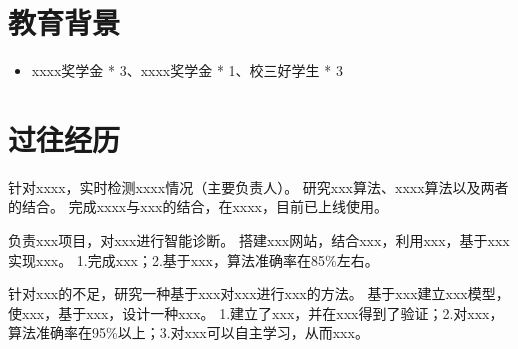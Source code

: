 \documentclass{resume}
\begin{document}




\sepspace
{}


\section{教育背景}
\begin{itemize}
  \item xxxx奖学金 * 3、xxxx奖学金 * 1、校三好学生 * 3
\end{itemize}

\section{过往经历}
\Content
{针对xxxx，实时检测xxxx情况（主要负责人）。}
{研究xxx算法、xxxx算法以及两者的结合。}
{完成xxxx与xxx的结合，在xxxx，目前已上线使用。}

\Content
{负责xxx项目，对xxx进行智能诊断。}
{搭建xxx网站，结合xxx，利用xxx，基于xxx实现xxx。}
{1.完成xxx；2.基于xxx，算法准确率在85\%左右。}

\Content
{针对xxx的不足，研究一种基于xxx对xxx进行xxx的方法。}
{基于xxx建立xxx模型，使xxx，基于xxx，设计一种xxx。}
{1.建立了xxx，并在xxx得到了验证；2.对xxx，算法准确率在95\%以上；3.对xxx可以自主学习，从而xxx。}
\end{document}
